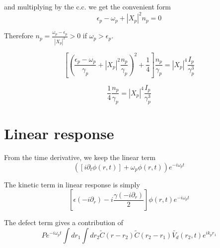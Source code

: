 \documentclass[a4paper,prb,10pt,aps,twocolumn]{revtex4-1}
\begin{document}
and multiplying by the c.c. we get the convenient form
\begin{equation}
  \label{eq:16}
  \epsilon_{p}-\omega_{p}+\left|X_{p}\right|^{2}n_{p}=0
\end{equation}


Therefore $n_{p}=\frac{\omega_{p}-\epsilon_{p}}{\left|X_{p}\right|^{2}}>0$ if $\omega_{p}>\epsilon_{p}$.


\begin{equation}
  \label{eq:20}
\left[\left(\frac{\epsilon_{p}-\omega_{p}}{\gamma_{p}}+\left|X_{p}\right|^{2}\frac{n_{p}}{\gamma_{p}}\right)^{2}+\frac{1}{4}\right]\frac{n_{p}}{\gamma_{p}}=\left|X_{p}\right|^{4}\frac{I_{p}}{\gamma_{p}^{3}}  
\end{equation}

\begin{equation}
  \label{eq:21}
\frac{1}{4}\frac{n_{p}}{\gamma_{p}}=\left|X_{p}\right|^{4}\frac{I_{p}}{\gamma_{p}^{3}}
\end{equation}


\section{Linear response}


From the time derivative, we keep the linear term
\begin{equation}
  \label{eq:22}
\left(\left[i\partial_{t}\phi(r,t)\right]+\omega_{p}\phi(r,t)\right)e^{-i\omega_{p}t}
\end{equation}


The kinetic term in linear response is simply
\begin{equation}
  \label{eq:18}
\left[\epsilon(-i\partial_{r})-i\frac{\gamma(-i\partial_{r})}{2}\right]\phi(r,t)e^{-i\omega_{p}t}
\end{equation}


The defect term gives a contribution of
\begin{equation}
  \label{eq:23}
Pe^{-i\omega_{p}t}\int dr_{1}\int dr_{2}\tilde{C}\left(r-r_{2}\right)\tilde{C}\left(r_{2}-r_{1}\right)\tilde{V_{d}}(r_{2},t)e^{ik_{p}r_{1}}
\end{equation}


\end{document}
